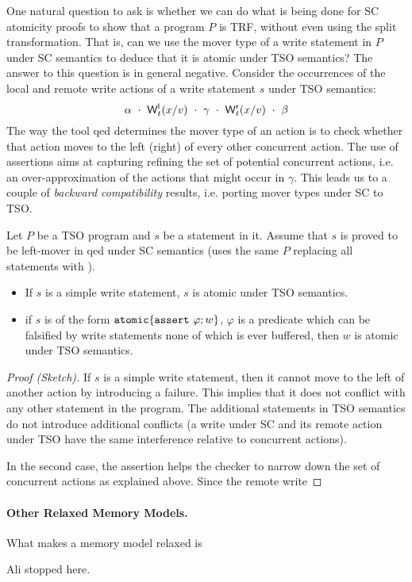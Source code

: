\documentclass[preprint,9pt]{sigplanconf}
\begin{document}
{One natural question to ask is whether we can do what is being done for SC atomicity proofs to show that a program $P$ is TRF, without even using the split transformation.
That is, can we use the mover type of a write statement in $P$ under SC semantics to deduce that it is atomic under TSO semantics?
The answer to this question is in general negative.
Consider the occurrences of the local and remote write actions of a write statement $s$ under TSO semantics:
\[
\alpha\ \cdot\ \locwritex t x v\ \cdot\ \gamma\ \cdot\ \remwritex t x v\ \cdot\ \beta
\]
The way the tool {\sc qed} determines the mover type of an action is to check whether that action moves to the left (right) of every other concurrent action.
The use of assertions aims at capturing refining the set of potential concurrent actions, i.e. an over-approximation of the actions that might occur in $\gamma$.
This leads us to a couple of {\em backward compatibility} results, i.e. porting mover types under SC to TSO.
\begin{lemma}
Let $P$ be a TSO program and $s$ be a statement in it.
Assume that $s$ is proved to be left-mover in {\sc qed} under SC semantics (uses the same $P$ replacing all {\alifence} statements with {\aliskip}). 
\begin{itemize}
\item If $s$ is a simple write statement, $s$ is atomic under TSO semantics.
\item if $s$ is of the form $\mathtt{atomic}\{\mathtt{assert}\ \varphi; w\}$, $\varphi$ is a predicate which can be falsified by write statements none of which is ever buffered, then $w$ is atomic under TSO semantics.
\end{itemize}
\end{lemma}
\begin{proof}[Proof (Sketch)]
If $s$ is a simple write statement, then it cannot move to the left of another action by introducing a failure.
This implies that it does not conflict with any other statement in the program.
The additional statements in TSO semantics do not introduce additional conflicts (a write under SC and its remote action under TSO have the same interference relative to concurrent actions).

In the second case, the assertion helps the checker to narrow down the set of concurrent actions as explained above.
Since the remote write 
\end{proof}

\paragraph{Other Relaxed Memory Models.}
What makes a memory model relaxed is



{\sc Ali stopped here.}
}
\end{document}
